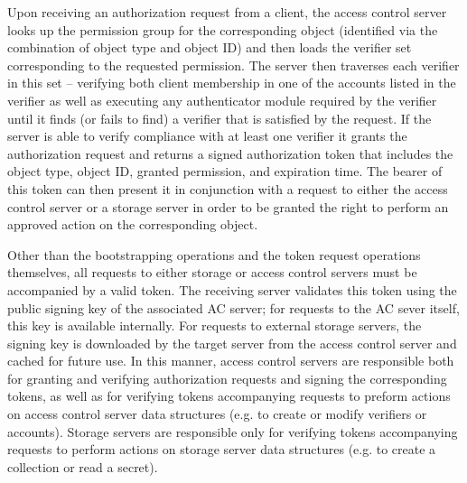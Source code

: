 

Upon receiving an authorization request from a client, the access
control server looks up the permission group for the corresponding
object (identified via the combination of object type and object ID)
and then loads the verifier set corresponding to the requested
permission. The server then traverses each verifier in this set --
verifying both client membership in one of the accounts listed in the
verifier as well as executing any authenticator module required by the
verifier until it finds (or fails to find) a verifier that is
satisfied by the request. If the server is able to verify compliance
with at least one verifier it grants the authorization request and
returns a signed authorization token that includes the object type,
object ID, granted permission, and expiration time. The bearer of this
token can then present it in conjunction with a request to either the
access control server or a storage server in order to be granted the
right to perform an approved action on the corresponding object.

Other than the bootstrapping operations and the token request
operations themselves, all requests to either storage or access
control servers must be accompanied by a valid token. The receiving
server validates this token using the public signing key of the
associated AC server; for requests to the AC sever itself, this key is
available internally. For requests to external storage servers, the
signing key is downloaded by the target server from the access control
server and cached for future use. In this manner, access control
servers are responsible both for granting and verifying authorization
requests and signing the corresponding tokens, as well as for verifying
tokens accompanying requests to preform actions on access control
server data structures (e.g. to create or modify verifiers or
accounts). Storage servers are responsible only for verifying tokens
accompanying requests to perform actions on storage server data
structures (e.g. to create a collection or read a secret).

